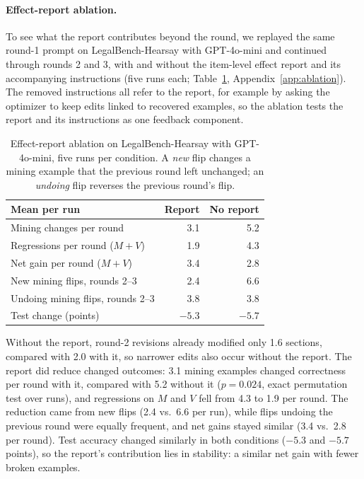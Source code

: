 \documentclass[11pt]{article}
\begin{document}
\paragraph{Effect-report ablation.}
\label{sec:ablation}
To see what the report contributes beyond the round, we replayed the same round-1 prompt on LegalBench-Hearsay with GPT-4o-mini and continued through rounds 2 and 3, with and without the item-level effect report and its accompanying instructions (five runs each; Table~\ref{tab:ablation}, Appendix~\ref{app:ablation}). The removed instructions all refer to the report, for example by asking the optimizer to keep edits linked to recovered examples, so the ablation tests the report and its instructions as one feedback component.

\begin{table}[!t]
\centering
\small
\setlength{\tabcolsep}{4pt}
\begin{tabular}{lrr}
\toprule
\rowcolor{midblue}
Mean per run & Report & No report \\
\midrule
Mining changes per round & 3.1 & 5.2 \\
Regressions per round ($M{+}V$) & 1.9 & 4.3 \\
Net gain per round ($M{+}V$) & 3.4 & 2.8 \\
New mining flips, rounds 2--3 & 2.4 & 6.6 \\
Undoing mining flips, rounds 2--3 & 3.8 & 3.8 \\
Test change (points) & $-5.3$ & $-5.7$ \\
\bottomrule
\end{tabular}
\caption{Effect-report ablation on LegalBench-Hearsay with GPT-4o-mini, five runs per condition. A \emph{new} flip changes a mining example that the previous round left unchanged; an \emph{undoing} flip reverses the previous round's flip.}
\label{tab:ablation}
\end{table}

Without the report, round-2 revisions already modified only 1.6 sections, compared with 2.0 with it, so narrower edits also occur without the report. The report did reduce changed outcomes: 3.1 mining examples changed correctness per round with it, compared with 5.2 without it ($p=0.024$, exact permutation test over runs), and regressions on $M$ and $V$ fell from 4.3 to 1.9 per round. The reduction came from new flips (2.4 vs.\ 6.6 per run), while flips undoing the previous round were equally frequent, and net gains stayed similar (3.4 vs.\ 2.8 per round). Test accuracy changed similarly in both conditions ($-5.3$ and $-5.7$ points), so the report's contribution lies in stability: a similar net gain with fewer broken examples.
\end{document}
